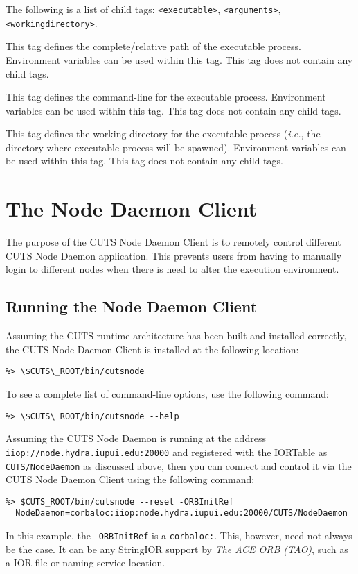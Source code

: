 \noindent The following is a list of child tags:
\texttt{<executable>}, \texttt{<arguments>}, \texttt{<workingdirectory>}.


This tag defines the complete/relative path of the executable process.
Environment variables can be used within this tag. This tag does not
contain any child tags.


This tag defines the command-line for the executable process.
Environment variables can be used within this tag. This tag does not
contain any child tags.


This tag defines the working directory for the executable process 
(\textit{i.e.}, the directory where executable process will be spawned).
Environment variables can be used within this tag. This tag does not
contain any child tags.

\section{The Node Daemon Client}
\label{sec:node-daemon-client}

The purpose of the CUTS Node Daemon Client is to remotely control
different CUTS Node Daemon application. This prevents users from
having to manually login to different nodes when there is need to 
alter the execution environment.

\subsection{Running the Node Daemon Client}
\label{sec:node-daemon-config}

Assuming the CUTS runtime architecture has been built and installed 
correctly, the CUTS Node Daemon Client is installed at the following 
location:
\begin{lstlisting}
%> \$CUTS\_ROOT/bin/cutsnode
\end{lstlisting}
To see a complete list of command-line options, use the following 
command:
\begin{lstlisting}
%> \$CUTS\_ROOT/bin/cutsnode --help
\end{lstlisting}
Assuming the CUTS Node Daemon is running at the address 
\texttt{iiop://node.hydra.iupui.edu:20000} and registered with 
the IORTable as \texttt{CUTS/NodeDaemon} as discussed above,
then you can connect and control it via the CUTS Node
Daemon Client using the following command: 
\begin{lstlisting}
%> $CUTS_ROOT/bin/cutsnode --reset -ORBInitRef 
  NodeDaemon=corbaloc:iiop:node.hydra.iupui.edu:20000/CUTS/NodeDaemon
\end{lstlisting}
In this example, the \texttt{-ORBInitRef} is a \texttt{corbaloc:}. This,
however, need not always be the case. It can be any StringIOR support by
\textit{The ACE ORB (TAO)}, such as a IOR file or naming service location.

